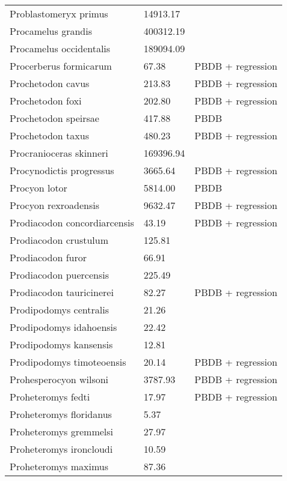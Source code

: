 \documentclass{article}
\begin{document}
\begin{center}
\begin{longtable}{p{} p{} p{}}
    Problastomeryx primus & 14913.17 & \cite{Tomiya2013} \\ 
    Procamelus grandis & 400312.19 & \cite{Tomiya2013} \\ 
    Procamelus occidentalis & 189094.09 & \cite{Tomiya2013} \\ 
    Procerberus formicarum & 67.38 & PBDB + regression \\ 
    Prochetodon cavus & 213.83 & PBDB + regression \\ 
    Prochetodon foxi & 202.80 & PBDB + regression \\ 
    Prochetodon speirsae & 417.88 & PBDB \\ 
    Prochetodon taxus & 480.23 & PBDB + regression \\ 
    Procranioceras skinneri & 169396.94 & \cite{Tomiya2013} \\ 
    Procynodictis progressus & 3665.64 & PBDB + regression \\ 
    Procyon lotor & 5814.00 & PBDB \\ 
    Procyon rexroadensis & 9632.47 & PBDB + regression \\ 
    Prodiacodon concordiarcensis & 43.19 & PBDB + regression \\ 
    Prodiacodon crustulum & 125.81 & \cite{Lim2001} \\ 
    Prodiacodon furor & 66.91 & \cite{Scott1937} \\ 
    Prodiacodon puercensis & 225.49 & \cite{Mellett1969} \\ 
    Prodiacodon tauricinerei & 82.27 & PBDB + regression \\ 
    Prodipodomys centralis & 21.26 & \cite{Becker1981} \\ 
    Prodipodomys idahoensis & 22.42 & \cite{Tomiya2013} \\ 
    Prodipodomys kansensis & 12.81 & \cite{Tomiya2013} \\ 
    Prodipodomys timoteoensis & 20.14 & PBDB + regression \\ 
    Prohesperocyon wilsoni & 3787.93 & PBDB + regression \\ 
    Proheteromys fedti & 17.97 & PBDB + regression \\ 
    Proheteromys floridanus & 5.37 & \cite{Tomiya2013} \\ 
    Proheteromys gremmelsi & 27.97 & \cite{Becker1981} \\ 
    Proheteromys ironcloudi & 10.59 & \cite{Tomiya2013} \\ 
    Proheteromys maximus & 87.36 & \cite{Tomiya2013} \\ 

\end{longtable}
\end{center}
\end{document}
